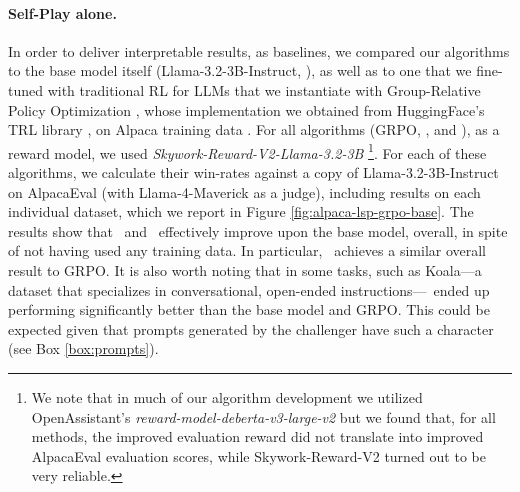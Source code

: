 \documentclass[]{fairmeta}
\newcommand{\alz}{\text{LSP-Zero}}
\newcommand{\al}{\text{LSP}}
\begin{document}
\paragraph{\textbf{Self-Play alone.}} In order to deliver interpretable results, as baselines, we compared our algorithms to the base model itself (Llama-3.2-3B-Instruct, \citep{dubey2024llama, meta2024llama32instruct}), as well as to one that we fine-tuned with traditional RL for LLMs that we instantiate with Group-Relative Policy Optimization \citep[GRPO]{shao2024deepseekmath}, whose implementation we obtained from HuggingFace's TRL library \citep{vonwerra2022trl}, on Alpaca training data \citep{taori2023alpaca}.
For all algorithms (GRPO, {\alz}, and {\al}), as a reward model, we used \emph{Skywork-Reward-V2-Llama-3.2-3B} \citep{liu2025skywork}\footnote{We note that in much of our algorithm development we utilized OpenAssistant's \emph{reward-model-deberta-v3-large-v2} but we found that, for all methods, the improved evaluation reward did not translate into improved AlpacaEval evaluation scores, while Skywork-Reward-V2 turned out to be very reliable.}.
For each of these algorithms, we calculate their win-rates against a copy of Llama-3.2-3B-Instruct on AlpacaEval (with Llama-4-Maverick as a judge), including results on each individual dataset, which we report in Figure \ref{fig:alpaca-lsp-grpo-base}.
The results show that \alz\ and \al\ effectively improve upon the base model, overall, in spite of not having used any training data.
In particular, \al\ achieves a similar overall result to GRPO.
It is also worth noting that in some tasks, such as Koala---a dataset that specializes in conversational, open-ended instructions---\al\ ended up performing significantly better than the base model and GRPO.
This could be expected given that prompts generated by the challenger have such a character (see Box \ref{box:prompts}).
\end{document}
